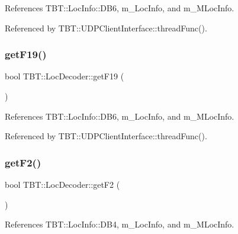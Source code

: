 References T\+B\+T\+::\+Loc\+Info\+::\+D\+B6, m\+\_\+\+Loc\+Info, and m\+\_\+\+M\+Loc\+Info.



Referenced by T\+B\+T\+::\+U\+D\+P\+Client\+Interface\+::thread\+Func().

\mbox{\label{classTBT_1_1LocDecoder_ad61a122b7e69336f878baa2f5670a4e8_ad61a122b7e69336f878baa2f5670a4e8}} 
\subsubsection{\texorpdfstring{get\+F19()}{getF19()}}
{\footnotesize\ttfamily bool T\+B\+T\+::\+Loc\+Decoder\+::get\+F19 (\begin{DoxyParamCaption}{ }\end{DoxyParamCaption})\hspace{0.3cm}{\ttfamily [inline]}}



References T\+B\+T\+::\+Loc\+Info\+::\+D\+B6, m\+\_\+\+Loc\+Info, and m\+\_\+\+M\+Loc\+Info.



Referenced by T\+B\+T\+::\+U\+D\+P\+Client\+Interface\+::thread\+Func().

\mbox{\label{classTBT_1_1LocDecoder_a1ed926bf58e50df8dd8650f268c26b6f_a1ed926bf58e50df8dd8650f268c26b6f}} 
\subsubsection{\texorpdfstring{get\+F2()}{getF2()}}
{\footnotesize\ttfamily bool T\+B\+T\+::\+Loc\+Decoder\+::get\+F2 (\begin{DoxyParamCaption}{ }\end{DoxyParamCaption})\hspace{0.3cm}{\ttfamily [inline]}}



References T\+B\+T\+::\+Loc\+Info\+::\+D\+B4, m\+\_\+\+Loc\+Info, and m\+\_\+\+M\+Loc\+Info.



